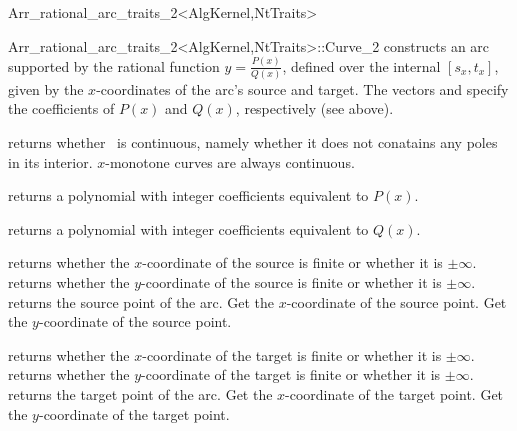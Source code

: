 \begin{ccRefClass}{Arr_rational_arc_traits_2<AlgKernel,NtTraits>}
\begin{ccClass}{Arr_rational_arc_traits_2<AlgKernel,NtTraits>::Curve_2}
  {constructs an arc supported by the rational function
   $y = \frac{P(x)}{Q(x)}$, defined over the internal $[s_x, t_x]$,
   given by the $x$-coordinates of the arc's source and target.
   The vectors  and  specify the coefficients
   of $P(x)$ and $Q(x)$, respectively (see above).
   }

\ccAccessFunctions

  {returns whether \ccVar\ is continuous, namely whether it does not
   conatains any poles in its interior. $x$-monotone curves are always
   continuous.}

  {returns a polynomial with integer coefficients equivalent to $P(x)$.}

  {returns a polynomial with integer coefficients equivalent to $Q(x)$.}

  {returns whether the $x$-coordinate of the source is finite or
   whether it is $\pm\infty$.}
\ccGlue
{}
  {returns whether the $y$-coordinate of the source is finite or
   whether it is $\pm\infty$.}
\ccGlue
{}
  {returns the source point of the arc.
   }
\ccGlue
{}
  {Get the $x$-coordinate of the source point.
   }
\ccGlue
{}
  {Get the $y$-coordinate of the source point.
   }

  {returns whether the $x$-coordinate of the target is finite or
   whether it is $\pm\infty$.}
\ccGlue
{}
  {returns whether the $y$-coordinate of the target is finite or
   whether it is $\pm\infty$.}
\ccGlue
{}
  {returns the target point of the arc.
   }
\ccGlue
{}
  {Get the $x$-coordinate of the target point.
   }
\ccGlue
{}
  {Get the $y$-coordinate of the target point.
   }


\end{ccClass}
\end{ccRefClass}
